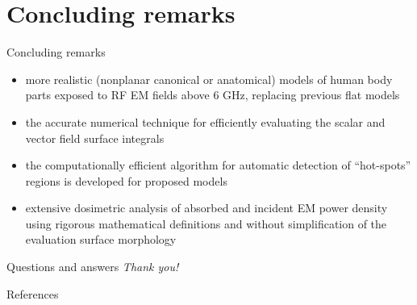 \documentclass[xcolor=dvipsnames,10pt]{beamer}
\begin{document}
\section[Concluding remarks]{Concluding remarks}
\begin{frame}{Concluding remarks}
    \begin{itemize}
        \item more realistic (nonplanar canonical or anatomical) models of human body parts exposed to RF EM fields above 6 GHz, replacing previous flat models
        \item the accurate numerical technique for efficiently evaluating the scalar and vector field surface integrals
        \item the computationally efficient algorithm for automatic detection of ``hot-spots'' regions is developed for proposed models
        \item extensive dosimetric analysis of absorbed and incident EM power density using rigorous mathematical definitions and without simplification of the evaluation surface morphology
    \end{itemize}
\end{frame}

\begin{frame}{Questions and answers}
    \centering \LARGE \emph{Thank you!}
\end{frame}

\begin{frame}[allowframebreaks]{References}
  \printbibliography[heading=none]
\end{frame}
\end{document}
